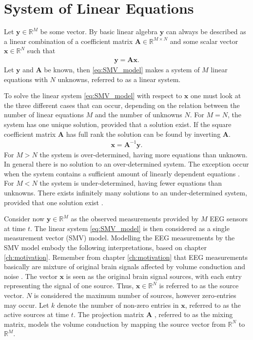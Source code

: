 \section{System of Linear Equations}\label{sec:SMV}
Let $\mathbf{y} \in \mathbb{R}^M$ be some vector. By basic linear algebra $\mathbf{y}$ can always be described as a linear combination of a coefficient matrix $\mathbf{A} \in \mathbb{R}^{M \times N}$ and some scalar vector $\mathbf{x} \in \mathbb{R}^N$ such that
\begin{align}\label{eq:SMV_model}
\mathbf{y} = \mathbf{Ax}.
\end{align}
Let $\mathbf{y}$ and $\mathbf{A}$ be known, then  
\ref{eq:SMV_model} makes a system of $M$ linear equations with $N$ unknowns, referred to as a linear system. 

To solve the linear system \ref{eq:SMV_model} with respect to $\textbf{x}$ one must look at the three different cases that can occur, depending on the relation between the number of linear equations $M$ and the number of unknowns $N$.
For $M = N$, the system has one unique solution, provided that a solution exist.  
If the square coefficient matrix $\mathbf{A}$ has full rank the solution can be found by inverting $\mathbf{A}$.
\begin{align*}
\mathbf{x} = \mathbf{A}^{-1} \mathbf{y}.
\end{align*}
For $M > N$ the system is over-determined, having more equations than unknown. In general there is no solution to an over-determined system. The exception occur when the system contains a sufficient amount of linearly dependent equations .    
For $M < N$ the system is under-determined, having fewer equations than unknowns. There exists infinitely many solutions to an under-determined system, provided that one solution exist \cite[p. ix]{CS}.  

Consider now $\mathbf{y} \in \mathbb{R}^M$ as the observed measurements provided by $M$ EEG sensors at time $t$. 
The linear system \ref{eq:SMV_model} is then considered as a single measurement vector (SMV) model.  
Modelling the EEG measurements by the SMV model embody the following interpretations, based on chapter \ref{ch:motivation}.
Remember from chapter \ref{ch:motivation} that EEG measurements basically are mixture of original brain signals affected by volume conduction and noise .
The vector $\mathbf{x}$ is seen as the original brain signal sources, with each entry representing the signal of one source. 
Thus, $\mathbf{x} \in \mathbb{R}^N$ is referred to as the source vector. 
$N$ is considered the maximum number of sources, however zero-entries may occur. 
Let $k$ denote the number of non-zero entries in $\mathbf{x}$, referred to as the active sources at time $t$.   
The projection matrix $\mathbf{A}$ , referred to as the mixing matrix, models the volume conduction by mapping the source vector from $\mathbb{R}^N$ to $\mathbb{R}^M$.

